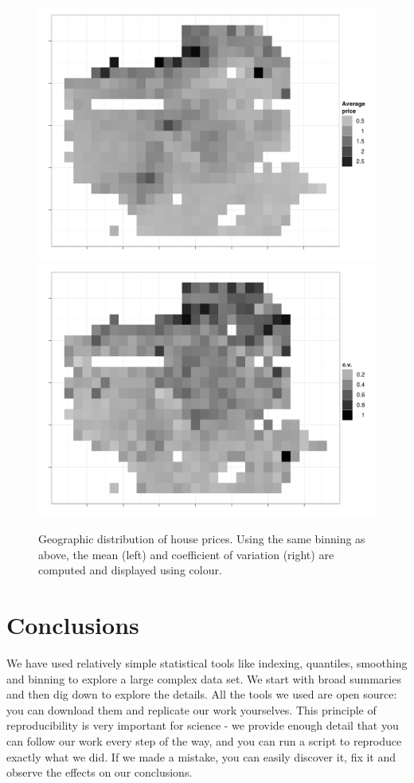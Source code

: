 \documentclass[oneside]{article}
\begin{document}
\begin{figure}[htbp]
  \centering
    \includegraphics[width=0.5\linewidth]{sf-bin-price}%
    \includegraphics[width=0.5\linewidth]{sf-bin-cv}
  \caption{Geographic distribution of house prices.  Using the same binning as above, the mean (left) and coefficient of variation (right) are computed and displayed using colour.  }
  \label{fig:sf-price}
\end{figure}


\section{Conclusions}

We have used relatively simple statistical tools like indexing, quantiles, smoothing and binning to explore a large complex data set.  We start with broad summaries and then dig down to explore the details.  All the tools we used are open source: you can download them and replicate our work yourselves. This principle of reproducibility \citep{gentleman:2007} is very important for science - we provide enough detail that you can follow our work every step of the way, and you can run a script to reproduce exactly what we did.  If we made a mistake, you can easily discover it, fix it and observe the effects on our conclusions.  
\end{document}

